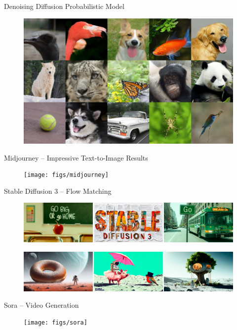 \documentclass{beamer}
\begin{document}
\begin{frame}{Denoising Diffusion Probabilistic Model}
	\begin{figure}
		\includegraphics[width=\linewidth]{figs/diffusion_models}
	\end{figure}
\end{frame}
\begin{frame}{Midjourney -- Impressive Text-to-Image Results}
	\begin{figure}
		\texttt{[image: figs/midjourney]}
	\end{figure}
\end{frame}
\begin{frame}{Stable Diffusion 3 -- Flow Matching}
		\begin{figure}
			\includegraphics[width=\linewidth]{figs/sd3_1}
		\end{figure}
		\begin{figure}
			\includegraphics[width=\linewidth]{figs/sd3_2}
		\end{figure}
\end{frame}
\begin{frame}{Sora -- Video Generation}
		\begin{figure}
			\texttt{[image: figs/sora]}
		\end{figure}
\end{frame}
\end{document}
